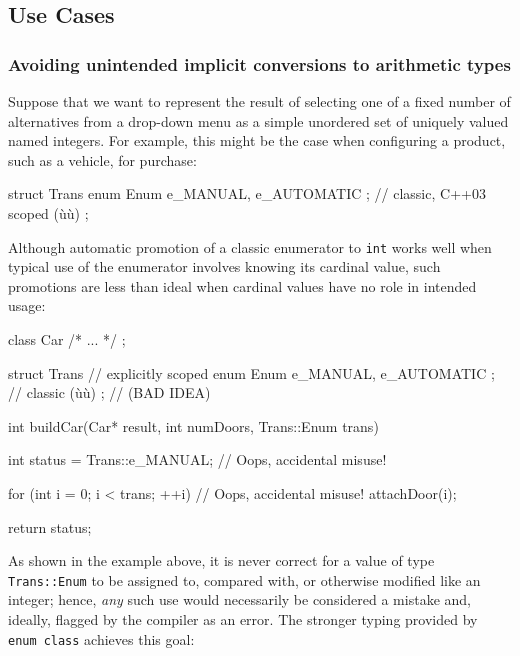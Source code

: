 \subsection[Use Cases]{Use Cases}\label{use-cases-enumclass}

\subsubsection[Avoiding unintended implicit conversions to arithmetic types]{Avoiding unintended implicit conversions to arithmetic types}\label{avoiding-unintended-implicit-conversions-to-arithmetic-types}

Suppose that we want to represent the result of selecting one of a fixed
number of alternatives from a drop-down menu as a simple unordered set
of uniquely valued named integers. For example, this might be the case
when configuring a product, such as a vehicle, for purchase:

\begin{emcppslisting}
struct Trans
{
    enum Enum { e_MANUAL, e_AUTOMATIC };  // classic, C++03 scoped (ù{}ù)
};
\end{emcppslisting}

\noindent Although automatic promotion of a classic enumerator to \texttt{int}
works well when typical use of the enumerator involves knowing its
cardinal value, such promotions are less than ideal when cardinal values
have no role in intended usage:

\begin{emcppslisting}
class Car { /* ... */ };

struct Trans
{                                         // explicitly scoped
    enum Enum { e_MANUAL, e_AUTOMATIC };  // classic (ù{}ù)
};                                        // (BAD IDEA)

int buildCar(Car* result, int numDoors, Trans::Enum trans)
{
    int status = Trans::e_MANUAL;    // Oops, accidental misuse!

    for (int i = 0; i < trans; ++i)  // Oops, accidental misuse!
    {
         attachDoor(i);
    }

    return status;
}
\end{emcppslisting}

\noindent As shown in the example above, it is never correct for a value of type
\texttt{Trans::Enum} to be assigned to, compared with, or otherwise
modified like an integer; hence, \emph{any} such use would necessarily
be considered a mistake and, ideally, flagged by the compiler as an
error. The stronger typing provided by \texttt{enum}~\texttt{class}
achieves this goal:

